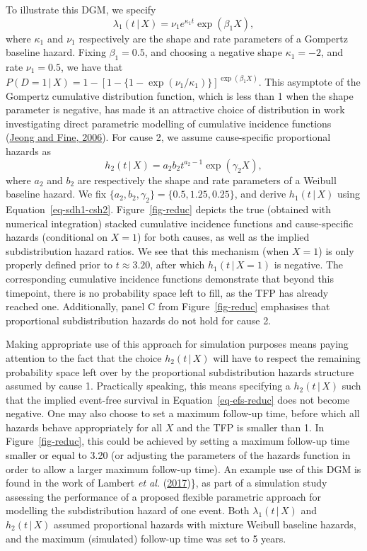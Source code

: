 \documentclass[
  letterpaper,
  DIV=11,
  numbers=noendperiod]{scrreprt}
\newcommand{\given}{\,|\,}
\begin{document}
To illustrate this DGM, we specify \begin{equation*}
    \lambda_1(t \given X) = \nu_1 e^{\kappa_1 t} \exp(\beta_1 X),
\end{equation*} where \(\kappa_1\) and \(\nu_1\) respectively are the
shape and rate parameters of a Gompertz baseline hazard. Fixing
\(\beta_1 = 0.5\), and choosing a negative shape \(\kappa_1 = -2\), and
rate \(\nu_1 = 0.5\), we have that
\(P(D = 1 \given X) = 1 - [1 - \{1 - \exp(\nu_1/\kappa_1)\}]^{\exp(\beta_1 X)}\).
This asymptote of the Gompertz cumulative distribution function, which
is less than 1 when the shape parameter is negative, has made it an
attractive choice of distribution in work investigating direct
parametric modelling of cumulative incidence functions
(\protect\hyperlink{ref-jeongDirectParametricInference2006}{Jeong and
Fine, 2006}). For cause 2, we assume cause-specific proportional hazards
as \begin{equation*}
    h_2(t \given X) = a_2 b_2t^{a_2 - 1} \exp(\gamma_2 X),
\end{equation*} where \(a_2\) and \(b_2\) are respectively the shape and
rate parameters of a Weibull baseline hazard. We fix
\(\{a_2, b_2, \gamma_2\} = \{0.5, 1.25, 0.25\}\), and derive
\(h_1(t \given X)\) using Equation~\ref{eq-sdh1-csh2}.
Figure~\ref{fig-reduc} depicts the true (obtained with numerical
integration) stacked cumulative incidence functions and cause-specific
hazards (conditional on \(X = 1\)) for both causes, as well as the
implied subdistribution hazard ratios. We see that this mechanism (when
\(X = 1\)) is only properly defined prior to \(t \approx 3.20\), after
which \(h_1(t \given X = 1)\) is negative. The corresponding cumulative
incidence functions demonstrate that beyond this timepoint, there is no
probability space left to fill, as the TFP has already reached one.
Additionally, panel C from Figure~\ref{fig-reduc} emphasises that
proportional subdistribution hazards do not hold for cause 2.

Making appropriate use of this approach for simulation purposes means
paying attention to the fact that the choice \(h_2(t \given X)\) will
have to respect the remaining probability space left over by the
proportional subdistribution hazards structure assumed by cause 1.
Practically speaking, this means specifying a \(h_2(t \given X)\) such
that the implied event-free survival in Equation~\ref{eq-efs-reduc} does
not become negative. One may also choose to set a maximum follow-up
time, before which all hazards behave appropriately for all \(X\) and
the TFP is smaller than 1. In Figure~\ref{fig-reduc}, this could be
achieved by setting a maximum follow-up time smaller or equal to 3.20
(or adjusting the parameters of the hazards function in order to allow a
larger maximum follow-up time). An example use of this DGM is found in
the work of Lambert \emph{et al.}
(\protect\hyperlink{ref-lambertFlexibleParametricModelling2017}{2017})\},
as part of a simulation study assessing the performance of a proposed
flexible parametric approach for modelling the subdistribution hazard of
one event. Both \(\lambda_1(t \given X)\) and \(h_2(t \given X)\)
assumed proportional hazards with mixture Weibull baseline hazards, and
the maximum (simulated) follow-up time was set to 5 years.
\end{document}
